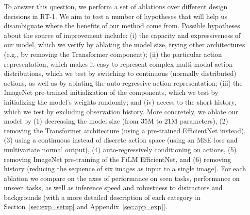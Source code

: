 \documentclass{article} %
\newcommand{\algname}{RT-1\xspace}
\begin{document}
To answer this question, we perform a set of ablations over different design decisions in \algname.
We aim to test a number of hypotheses that will help us disambiguate where the benefits of our method come from. 
Possible hypotheses about the source of improvement include: (i) the capacity and expressiveness of our model, which we verify by ablating the model size, trying other architectures (e.g., by removing the Transformer component); (ii) the particular action representation, which makes it easy to represent complex multi-modal action distributions, which we test by switching to continuous (normally distributed) actions, as well as by ablating the auto-regressive action representation;
(iii) the ImageNet pre-trained initialization of the components,
which we test by initializing the model's weights randomly; and (iv) access to the short history, which we test by excluding observation history.
More concretely, we ablate our model by (1) decreasing the model size (from 35M to 21M parameters), (2) removing the Transformer architecture (using a pre-trained EfficientNet instead), (3) using a continuous instead of discrete action space (using an MSE loss and multivariate normal output), (4) auto-regressively conditioning on actions,
(5) removing ImageNet pre-training of the FiLM EfficientNet, and (6) removing history (reducing the sequence of six images as input to a single image). 
For each ablation we compare on the axes of performance on seen tasks, performance on unseen tasks, as well as inference speed and robustness to distractors and backgrounds (with a more detailed description of each category in Section~\ref{sec:exp_setup} and Appendix~\ref{sec:app_exp}).
\end{document}
